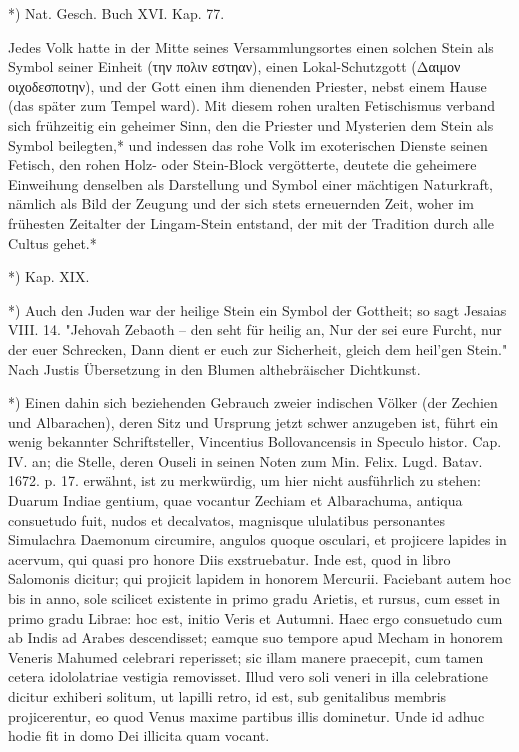 \documentclass[a4paper, 11pt, oneside, polutonikogreek, german]{article}
\begin{document}
*) Nat. Gesch. Buch XVI. Kap. 77.

Jedes Volk hatte in der Mitte seines Versammlungsortes einen solchen Stein als Symbol seiner Einheit (την πολιν εστηαν), einen Lokal-Schutzgott (Δαιμον οιχοδεσποτην), und der Gott einen ihm dienenden Priester, nebst einem Hause (das später zum Tempel ward). Mit diesem rohen uralten Fetischismus verband sich frühzeitig ein geheimer Sinn, den die Priester und Mysterien dem Stein als Symbol beilegten,* und indessen das rohe Volk im exoterischen Dienste seinen Fetisch, den rohen Holz- oder Stein-Block vergötterte, deutete die geheimere Einweihung denselben als Darstellung und Symbol einer mächtigen Naturkraft, nämlich als Bild der Zeugung und der sich stets erneuernden Zeit, woher im frühesten Zeitalter der Lingam-Stein entstand, der mit der Tradition durch alle Cultus gehet.*

*) Kap. XIX.

*) Auch den Juden war der heilige Stein ein Symbol der Gottheit; so sagt Jesaias VIII. 14. "Jehovah Zebaoth -- den seht für heilig an,
Nur der sei eure Furcht, nur der euer
Schrecken,
Dann dient er euch zur Sicherheit, gleich
dem heil'gen Stein."
Nach Justis Übersetzung in den Blumen althebräischer Dichtkunst.

*) Einen dahin sich beziehenden Gebrauch zweier indischen Völker (der Zechien und Albarachen), deren Sitz und Ursprung jetzt schwer anzugeben ist, führt ein wenig bekannter Schriftsteller, Vincentius Bollovancensis in Speculo histor. Cap. IV. an; die Stelle, deren Ouseli in seinen Noten zum Min. Felix. Lugd. Batav. 1672. p. 17. erwähnt, ist zu merkwürdig, um hier nicht ausführlich zu stehen:
Duarum Indiae gentium, quae vocantur Zechiam et Albarachuma, antiqua consuetudo fuit, nudos et decalvatos, magnisque ululatibus personantes Simulachra Daemonum circumire, angulos quoque osculari, et projicere lapides in acervum, qui quasi pro honore Diis exstruebatur. Inde est, quod in libro Salomonis dicitur; qui projicit lapidem in honorem Mercurii. Faciebant autem hoc bis in anno, sole scilicet existente in primo gradu Arietis, et rursus, cum esset in primo gradu Librae: hoc est, initio Veris et Autumni. Haec ergo consuetudo cum ab Indis ad Arabes descendisset; eamque suo tempore apud Mecham in honorem Veneris Mahumed celebrari reperisset; sic illam manere praecepit, cum tamen cetera idololatriae vestigia removisset. Illud vero soli veneri in illa celebratione dicitur exhiberi solitum, ut lapilli retro, id est, sub genitalibus membris projicerentur, eo quod Venus maxime partibus illis dominetur. Unde id adhuc hodie fit in domo Dei illicita quam vocant.
\end{document}
